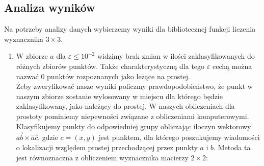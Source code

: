 \subsection{Analiza wyników}
\quad Na potrzeby analizy danych wybierzemy wyniki dla bibliotecznej 
funkcji liczenia wyznacznika $3 \times 3$.
\begin{enumerate}
    \item W zbiorze $a$ dla $\varepsilon \leq 10^{-2}$ widzimy brak zmian 
w ilości zaklasyfikowanych do różnych zbiorów punktów. Także charakterystyczną dla tego $\varepsilon$ 
cechą można nazwać $0$ punktów rozpoznanych jako leżące na prostej.\\
Żeby zweryfikować nasze wyniki policzmy prawdopodobieństwo, że punkt w naszym zbiorze zostanie 
wylosowany w miejscu dla którego będzie zaklasyfikowany, jako należący do prostej. 
W naszych obliczeniach dla prostoty pominiemy niepewności związane z obliczeniami komputerowymi.\\
Klasyfikujemy punkty do odpowiedniej grupy obliczając iloczyn wektorowy
$\overrightarrow{ab} \times \overrightarrow{ac}$, gdzie $ c = (x,y)$ jest punktem, dla którego poszukujemy wiadomości o lokalizacji względem prostej przechodzącej przez punkty $ a$ i $ b$. Metoda ta jest równoznaczna z obliczeniem wyznacznika macierzy $ 2\times2$:  


\end{enumerate}
